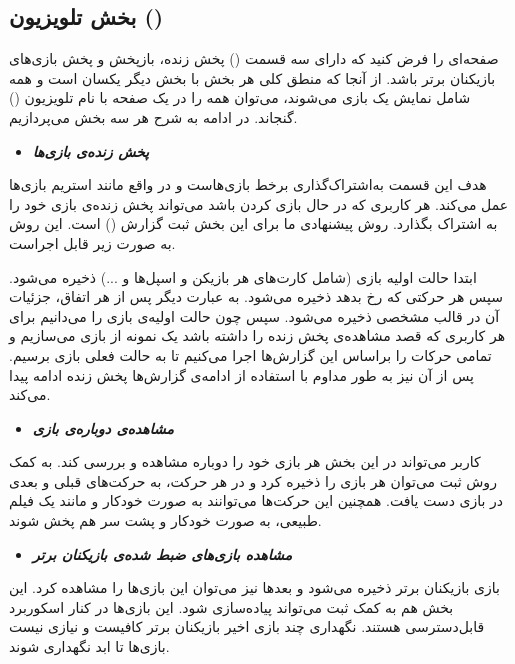 \documentclass[]{article}
\begin{document}
\subsection*{{\titr بخش تلویزیون ()}}

صفحه‌ای را فرض کنید که دارای سه قسمت () پخش زنده، باز‌پخش و پخش‌ بازی‌های بازیکنان برتر باشد.
از آنجا که منطق کلی هر بخش با بخش دیگر یکسان است و همه شامل نمایش یک بازی می‌شوند، می‌توان همه را در یک صفحه با نام تلویزیون () گنجاند. در ادامه به شرح هر سه بخش می‌پردازیم.
\\

\begin{itemize}
	\item \textbf{\emph{پخش زنده‌ی بازی‌ها}}
\end{itemize}
هدف این قسمت به‌اشتراک‌گذاری برخط بازی‌هاست و در واقع مانند استریم بازی‌ها عمل می‌کند. هر کاربری که در حال بازی کردن باشد می‌تواند پخش زنده‌ی بازی خود را به اشتراک بگذارد.
روش‌ پیشنهادی ما برای این بخش ثبت گزارش () است. این روش به صورت زیر قابل اجراست.

ابتدا حالت اولیه بازی (شامل کارت‌های هر بازیکن و اسپل‌ها و ...) ذخیره می‌شود. 
سپس هر حرکتی که رخ بدهد ذخیره می‌شود. به عبارت دیگر پس از هر اتفاق، جزئیات آن در قالب مشخصی ذخیره می‌شود. سپس چون حالت اولیه‌ی بازی را می‌دانیم برای هر کاربری که قصد مشاهده‌ی پخش زنده را داشته باشد یک نمونه از بازی می‌سازیم و تمامی حرکات را براساس این گزارش‌ها اجرا می‌کنیم تا به حالت فعلی بازی برسیم. پس از آن نیز به طور مداوم با استفاده از ادامه‌ی گزارش‌ها پخش زنده ادامه پیدا می‌کند.
\\

\begin{itemize}
	\item \textbf{\emph{مشاهده‌ی دوباره‌ی بازی}}
\end{itemize}
کاربر می‌تواند در این بخش هر بازی خود را دوباره مشاهده و بررسی کند. 
به کمک روش ثبت  می‌توان هر بازی را ذخیره کرد و در هر حرکت، به حرکت‌های قبلی و بعدی در بازی دست یافت. همچنین این حرکت‌ها می‌توانند به صورت خودکار و مانند یک فیلم طبیعی، به صورت خودکار و پشت سر هم پخش شوند.
\\

\begin{itemize}
	\item \textbf{\emph{مشاهده بازی‌های ضبط شده‌ی بازیکنان برتر}}
\end{itemize}
بازی بازیکنان برتر ذخیره می‌شود و بعد‌ها نیز می‌توان این بازی‌ها را مشاهده کرد. این بخش هم به کمک ثبت  می‌تواند پیاده‌سازی شود.
این بازی‌ها در کنار اسکوربرد قابل‌دسترسی هستند. نگهداری چند بازی اخیر بازیکنان برتر کافیست و نیازی نیست بازی‌ها تا ابد نگهداری شوند.
\end{document}
